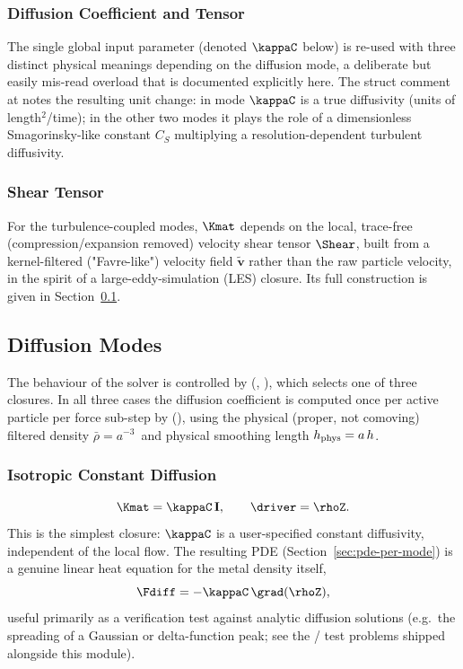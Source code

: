 \subsubsection{Diffusion Coefficient and Tensor}
\label{sec:diffusion-tensor}
The single global input parameter 
(denoted $\kappaC$ below) is re-used with three distinct physical
meanings depending on the diffusion mode, a deliberate but easily
mis-read overload that is documented explicitly here. The struct comment
at  notes the resulting unit
change: in  mode $\kappaC$ is a true diffusivity
(units of length$^2$/time); in the other two modes it plays the role of a
dimensionless Smagorinsky-like constant $C_S$ multiplying a
resolution-dependent turbulent diffusivity.

\subsubsection{Shear Tensor}
\label{sec:shear-tensor}
For the turbulence-coupled modes, $\Kmat$ depends on the local,
trace-free (compression/expansion removed) velocity shear tensor
$\Shear$, built from a kernel-filtered ("Favre-like") velocity field
$\tilde{\mathbf v}$ rather than the raw particle velocity, in the spirit
of a large-eddy-simulation (LES) closure. Its full construction is given
in Section~\ref{sec:diffusion-modes}.

\subsection{Diffusion Modes}
\label{sec:diffusion-modes}

The behaviour of the solver is controlled by
(, ),
which selects one of three closures. In all three cases the diffusion
coefficient is computed once per active particle per force sub-step by
(), using the physical (proper, not
comoving) filtered density $\bar\rho = a^{-3}\,$
and physical smoothing length $h_{\rm phys} = a\,h$.

\subsubsection{Isotropic Constant Diffusion}
\begin{equation}
  \Kmat = \kappaC \, \mathbf I , \qquad \driver = \rhoZ .
\end{equation}
This is the simplest closure: $\kappaC$ is a user-specified constant
diffusivity, independent of the local flow. The resulting PDE
(Section~\ref{sec:pde-per-mode}) is a genuine linear heat equation for
the metal density itself,
\begin{equation}
  \Fdiff = -\kappaC \,\grad(\rhoZ) ,
\end{equation}
useful primarily as a verification test against analytic diffusion
solutions (e.g.\ the spreading of a Gaussian or delta-function peak; see
the / test
problems shipped alongside this module).

